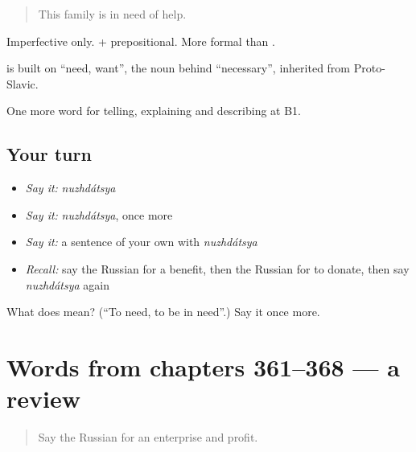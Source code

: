 \begin{quote}
This family is in need of help.
\end{quote}

Imperfective only. \emph{ } + prepositional. More formal than \emph{}.

\begin{cousinweb}
\textbf{} is built on \emph{} \textquotedblleft{}need, want\textquotedblright{}, the noun behind \emph{} \textquotedblleft{}necessary\textquotedblright{}, inherited from Proto-Slavic.
\end{cousinweb}

\begin{grammarlens}[title={What you've built}]
One more word for telling, explaining and describing at B1.
\end{grammarlens}

\subsection*{Your turn}
\begin{itemize}
\raggedright
  \item \emph{Say it:} \emph{nuzhdátsya}
  \item \emph{Say it:} \emph{nuzhdátsya}, once more
  \item \emph{Say it:} a sentence of your own with \emph{nuzhdátsya}
  \item \emph{Recall:} say the Russian for a benefit, then the Russian for to donate, then say \emph{nuzhdátsya} again
\end{itemize}

\begin{tcolorbox}[breakable,colback=teal!4,colframe=teal!35!black,title={Before you move on}]
What does  mean? (\textquotedblleft{}To need, to be in need\textquotedblright{}.) Say it once more.
\end{tcolorbox}
\section[(dialogue)]{Words from chapters 361–368 — a review}

\label{lesson:RU-R368-review-361-368}



\begin{quote}
Say the Russian for an enterprise and profit.
\end{quote}

